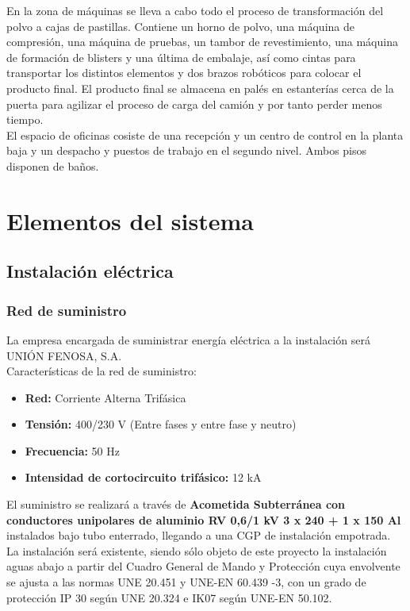 En la zona de máquinas se lleva a cabo todo el proceso de transformación del polvo a cajas de pastillas. Contiene un horno de polvo, una máquina de compresión, una máquina de pruebas, un tambor de revestimiento, una máquina de formación de blisters y una última de embalaje, así como cintas para transportar los distintos elementos y dos brazos robóticos para colocar el producto final. El producto final se almacena en palés en estanterías cerca de la puerta para agilizar el proceso de carga del camión y por tanto perder menos tiempo.
\\

El espacio de oficinas cosiste de una recepción y un centro de control en la planta baja y un despacho y puestos de trabajo en el segundo nivel. Ambos pisos disponen de baños.





\section{Elementos del sistema}

\subsection{Instalación eléctrica}

\subsubsection{Red de suministro}

La empresa encargada de suministrar energía eléctrica a la instalación será UNIÓN FENOSA, S.A.\\

Características de la red de suministro:\

\begin{itemize}
\item {\bfseries Red:} Corriente Alterna Trifásica 
\item {\bfseries Tensión:} 400/230 V (Entre fases y entre fase y neutro)
\item {\bfseries Frecuencia:} 50 Hz
\item {\bfseries Intensidad de cortocircuito trifásico:} 12 kA
\end{itemize}

El suministro se realizará a través de {\bfseries Acometida Subterránea con conductores unipolares de aluminio RV 0,6/1 kV 3 x 240 + 1 x 150 Al} instalados bajo tubo enterrado, llegando a una CGP de instalación empotrada. La instalación será existente, siendo sólo objeto de este proyecto la instalación aguas abajo a partir del Cuadro General de Mando y Protección cuya envolvente se ajusta a las normas UNE 20.451 y UNE-EN 60.439 -3, con un grado de protección IP 30 según UNE 20.324 e IK07 según UNE-EN 50.102.\\

